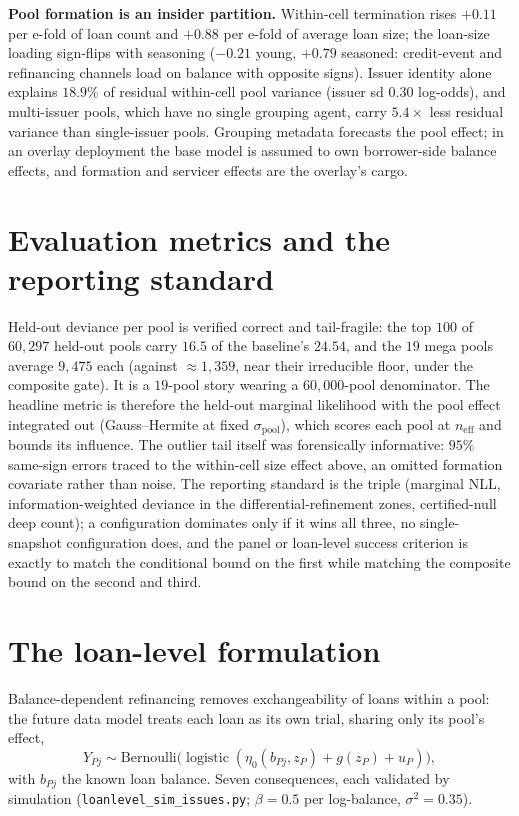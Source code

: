 \documentclass[11pt]{article}
\begin{document}
\textbf{Pool formation is an insider partition.} Within-cell termination
rises $+0.11$ per e-fold of loan count and $+0.88$ per e-fold of average
loan size; the loan-size loading sign-flips with seasoning ($-0.21$ young,
$+0.79$ seasoned: credit-event and refinancing channels load on balance
with opposite signs). Issuer identity alone explains $18.9\%$ of residual
within-cell pool variance (issuer sd $0.30$ log-odds), and multi-issuer
pools, which have no single grouping agent, carry $5.4\times$ less
residual variance than single-issuer pools. Grouping metadata forecasts
the pool effect; in an overlay deployment the base model is assumed to own
borrower-side balance effects, and formation and servicer effects are the
overlay's cargo.

\section{Evaluation metrics and the reporting standard}\label{sec:metrics}

Held-out deviance per pool is verified correct and tail-fragile: the top
$100$ of $60{,}297$ held-out pools carry $16.5$ of the baseline's $24.54$,
and the $19$ mega pools average $9{,}475$ each (against ${\approx}1{,}359$,
near their irreducible floor, under the composite gate). It is a
$19$-pool story wearing a $60{,}000$-pool denominator. The headline metric
is therefore the held-out marginal likelihood with the pool effect
integrated out (Gauss--Hermite at fixed $\sigma_{\mathrm{pool}}$), which
scores each pool at $n_{\mathrm{eff}}$ and bounds its influence. The
outlier tail itself was forensically informative: $95\%$ same-sign errors
traced to the within-cell size effect above, an omitted formation
covariate rather than noise. The reporting standard is the triple
(marginal NLL, information-weighted deviance in the differential-refinement
zones, certified-null deep count); a configuration dominates only if it
wins all three, no single-snapshot configuration does, and the panel or
loan-level success criterion is exactly to match the conditional bound on
the first while matching the composite bound on the second and third.


\section{The loan-level formulation}\label{sec:loanlevel}

Balance-dependent refinancing removes exchangeability of loans within a
pool: the future data model treats each loan as its own trial, sharing
only its pool's effect,
\[
Y_{Pj}\sim\mathrm{Bernoulli}\bigl(\operatorname{logistic}(\eta_0(b_{Pj},z_P)
+ g(z_P) + u_P)\bigr),
\]
with $b_{Pj}$ the known loan balance. Seven consequences, each validated
by simulation (\texttt{loanlevel\_sim\_issues.py}; $\beta=0.5$ per
log-balance, $\sigma^2=0.35$).
\end{document}
